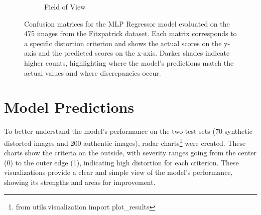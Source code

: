 \begin{figure}[ht]
\begin{subfigure}[b]{0.24\textwidth}
        \caption{Field of View}
        \label{fig:cm_fov}
    \end{subfigure}
    \caption{Confusion matrices for the MLP Regressor model evaluated on the 475 images from the Fitzpatrick dataset. Each matrix corresponds to a specific distortion criterion and shows the actual scores on the y-axis and the predicted scores on the x-axis. Darker shades indicate higher counts, highlighting where the model's predictions match the actual values and where discrepancies occur.}
    \label{fig:confusion_matrices}
\end{figure}
\vspace{\baselineskip}
\noindent

\clearpage
\section{Model Predictions}
\label{sec:VisualizingPredictions}
To better understand the model’s performance on the two test sets (70 synthetic distorted images and 200 authentic images), radar charts\footnote{from utils.visualization import plot\_results} were created. These charts show the criteria on the outside, with severity ranges going from the center (0) to the outer edge (1), indicating high distortion for each criterion. These visualizations provide a clear and simple view of the model’s performance, showing its strengths and areas for improvement. \par
